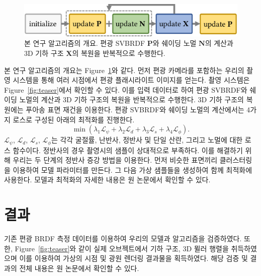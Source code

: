 \documentclass[a4paper,twocolumn]{article}
\begin{document}
\begin{figure}[tpb]
	\vspace{-2mm}%
	\centering%
	\footnotesize%
	\includegraphics[width=1.0\linewidth]{fig/pipeline-workflow}%
	\vspace{-3mm}%
	\caption{\label{fig:workflow}%
		본 연구 알고리즘의 개요. 편광 SVBRDF $\mathbf{P}$와 쉐이딩 노멀 $\mathbf{N}$의 계산과 3D 기하 구조 $\mathbf{X}$의 복원을 반복적으로 수행한다.
	}
	\vspace{-2mm}
\end{figure}
본 연구 알고리즘의 개요는 Figure~\ref{fig:workflow}와 같다. 먼저 편광 카메라를 포함하는 우리의 촬영 시스템을 통해 여러 시점에서 편광 플래시라이트 이미지를 얻는다. 촬영 시스템은 Figure~\ref{fig:teaser}에서 확인할 수 있다.
이를 입력 데이터로 하여 편광 SVBRDF와 쉐이딩 노멀의 계산과 3D 기하 구조의 복원을 반복적으로 수행한다. 
3D 기하 구조의 복원에는 푸아송 표면 재건을\cite{kazhdan2013screened} 이용한다.
편광 SVBRDF와 쉐이딩 노멀의 계산에서는 4가지 로스로 구성된 아래의 최적화를 진행한다.
\begin{equation}
	\label{eq:optimization}
	{\min}\left( {{\lambda }_{1}}{{\mathcal{L}}_{\psi}}+{{\lambda }_{2}}{{\mathcal{L}}_{d}}+{{\lambda }_{3}}{{\mathcal{L}}_{s}}+{{\lambda }_{4}}{{\mathcal{L}}_{\phi}} \right).
\end{equation}
%
${{\mathcal{L}}_{\psi}}$, ${{\mathcal{L}}_{d}}$, ${{\mathcal{L}}_{s}}$, ${{\mathcal{L}}_{\phi}}$는 각각 굴절률, 난반사, 정반사 및 단일 산란, 그리고 노멀에 대한 로스 함수이다.
정반사의 경우 촬영시의 샘플이 상대적으로 부족하다. 이를 해결하기 위해 우리는 두 단계의 정반사 증강 방법을 이용한다.
먼저 비슷한 표면끼리 클러스터링을 이용하여 모델 파라미터를 만든다. 그 다음 가상 샘플들을 생성하여 함께 최적화에 사용한다.
모델과 최적화의 자세한 내용은 원 논문에서 확인할 수 있다.


\section{결과}
\label{sec:results}
기존 편광 BRDF 측정 데이터를 이용하여 우리의 모델과 알고리즘을 검증하였다. 또한, Figure~\ref{fig:teaser}와 같이 실제 오브젝트에서 기하 구조, 3D 뮐러 행렬을 취득하였으며 이를 이용하여 가상의 시점 및 광원 렌더링 결과물을 획득하였다.
해당 검증 및 결과의 전체 내용은 원 논문에서 확인할 수 있다.
\end{document}
